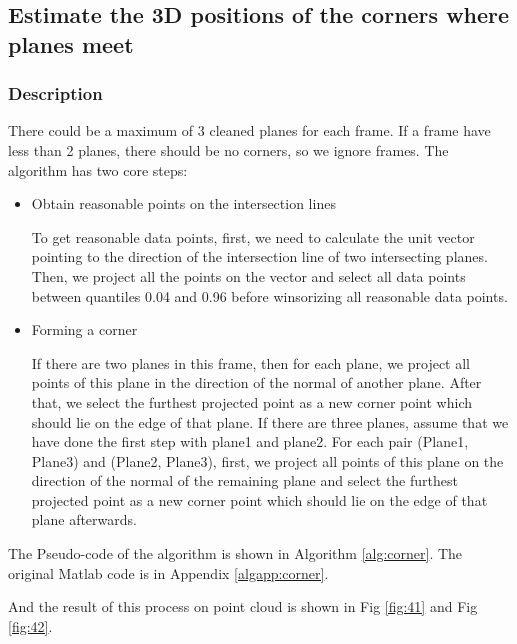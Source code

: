 \documentclass[10pt,a4paper]{article}
\begin{document}
\newpage

\subsection{Estimate the 3D positions of the corners where planes meet}  
\subsubsection{Description}
There could be a maximum of 3 cleaned planes for each frame. 
If a frame have less than 2 planes, there should be no corners, so we ignore frames. 
The algorithm has two core steps:
\begin{itemize}
	\item Obtain reasonable points on the intersection lines
	
	To get reasonable data points, first, we need to calculate the unit vector pointing to the direction of the intersection line of two intersecting planes. Then, we project all the points on the vector and select all data points between quantiles 0.04 and 0.96 before winsorizing all reasonable data points.
	\item Forming a corner 
	
    If there are two planes in this frame, then for each plane, we project all points of this plane in the direction of the normal of another plane. After that, we select the furthest projected point as a new corner point which should lie on the edge of that plane. If there are three planes, assume that we have done the first step with plane1 and plane2. For each pair (Plane1, Plane3) and (Plane2, Plane3), first, we project all points of this plane on the direction of the normal of the remaining plane and select the furthest projected point as a new corner point which should lie on the edge of that plane afterwards. 
\end{itemize}


The Pseudo-code of the algorithm is shown in Algorithm \ref{alg:corner}. 
The original Matlab code is in Appendix \ref{algapp:corner}.

And the result of this process on point cloud is shown in Fig \ref{fig:41} and Fig \ref{fig:42}.
\end{document}
